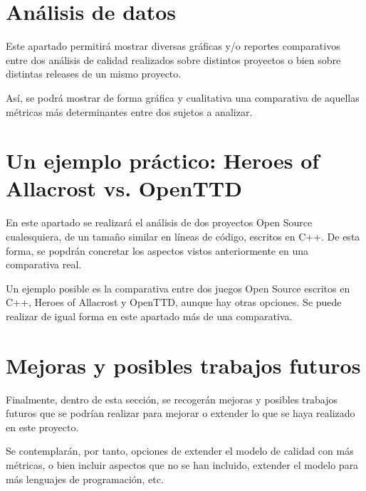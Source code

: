 \documentclass[11pt]{article}
\begin{document}
\section{Análisis de datos}

Este apartado permitirá mostrar diversas gráficas y/o reportes comparativos entre dos análisis de calidad realizados sobre distintos proyectos o bien sobre distintas releases de un mismo proyecto.

Así, se podrá mostrar de forma gráfica y cualitativa una comparativa de aquellas métricas más determinantes entre dos sujetos a analizar.


\section{Un ejemplo práctico: Heroes of Allacrost vs. OpenTTD}

En este apartado se realizará el análisis de dos proyectos Open Source cualesquiera, de un tamaño similar en líneas de código, escritos en C++. De esta forma, se popdrán concretar los aspectos vistos anteriormente en una comparativa real.

Un ejemplo posible es la comparativa entre dos juegos Open Source escritos en C++, Heroes of Allacrost y OpenTTD, aunque hay otras opciones. Se puede realizar de igual forma en este apartado más de una comparativa.


\section{Mejoras y posibles trabajos futuros}

Finalmente, dentro de esta sección, se recogerán mejoras y posibles trabajos futuros que se podrían realizar para mejorar o extender lo que se haya realizado en este proyecto.

Se contemplarán, por tanto, opciones de extender el modelo de calidad con más métricas, o bien incluir aspectos que no se han incluido, extender el modelo para más lenguajes de programación, etc.

\pagebreak

\pagebreak
\end{document}
